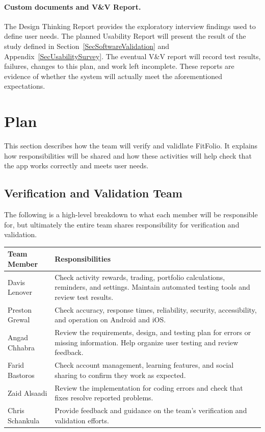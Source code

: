\documentclass[12pt, titlepage]{article}
\begin{document}
\paragraph{Custom documents and V\&V Report.} The Design Thinking Report provides the exploratory interview findings used to define user needs. The planned Usability Report will present the result of the study defined in Section~\ref{SecSoftwareValidation} and Appendix~\ref{SecUsabilitySurvey}. The eventual V\&V report will record test results, failures, changes to this plan, and work left incomplete. These reports are evidence of whether the system will actually meet the aforementioned expectations.
\section{Plan}

This section describes how the team will verify and validlate FitFolio. It explains how responsibilities will be shared and how these activities will help check that the app works correctly and meets user needs.

\subsection{Verification and Validation Team}


The following is a high-level breakdown to what each member will be
responsible for, but ultimately the entire team shares responsibility
for verification and validation.

\begin{center}
\begin{tabular}{p{} p{}}
\hline
\textbf{Team Member} & \textbf{Responsibilities} \\
\hline

Davis Lenover &
Check activity rewards, trading, portfolio calculations, reminders, and settings. Maintain automated testing tools and review test results. \\[6pt]

Preston Grewal &
Check accuracy, response times, reliability, security, accessibility,
and operation on Android and iOS. \\[6pt]

Angad Chhabra &
Review the requirements, design, and testing plan for errors or
missing information. Help organize user testing and review feedback. \\[6pt]

Farid Bastoros &
Check account management, learning features, and social sharing
to confirm they work as expected. \\[6pt]

Zaid Alsaadi &
Review the implementation for coding errors and check that fixes
resolve reported problems.  \\[6pt]


Chris Schankula & Provide feedback and guidance on the team's verification and validation efforts.

\\

\hline
\end{tabular}
\end{center}
\end{document}
